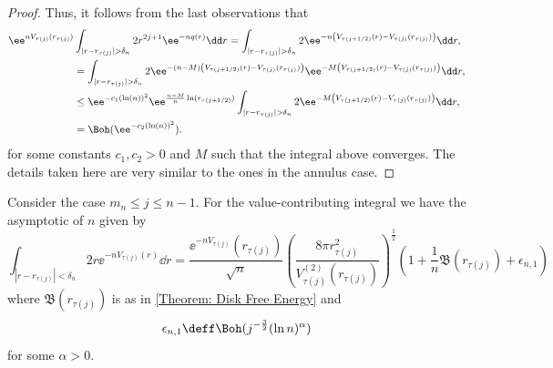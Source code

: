 \begin{proof}
Thus, it follows from the last observations that
\begin{align}
	\ee^{n V_{\tau(j)}(r_{\tau(j)})} & \int_{|r - r_{\tau(j)}| > \delta_n} 2 r^{2j + 1} \ee^{-n q(r)}  \dd r = \int_{|r - r_{\tau(j)}| > \delta_n} 2 \ee^{-n \left( V_{\tau(j + 1/2)}(r) - V_{\tau(j)}(r_{\tau(j)}) \right)} \dd r, \\	
	& = \int_{|r - r_{\tau(j)}| > \delta_n} 2 \ee^{-(n-M) \left( V_{\tau(j + 1/2)}(r) - V_{\tau(j)}(r_{\tau(j)}) \right)} \ee^{-M \left( V_{\tau(j + 1/2)}(r) - V_{\tau(j)}(r_{\tau(j)}) \right)} \dd r, \\	
	& \leq \ee^{-c_1 (\ln(n))^2} \ee^{\frac{n - M}{n} \ln(r_{\tau(j+1/2)})}  \int_{|r - r_{\tau(j)}| > \delta_n} 2 \ee^{-M \left( V_{\tau(j + 1/2)}(r) - V_{\tau(j)}(r_{\tau(j)}) \right)} \dd r, \\
	& = \Boh(\ee^{-c_2 (\ln(n))^2}).
\end{align}
for some constants $c_1, c_2 > 0$ and $M$ such that the integral above converges. The details taken here are very similar to the ones in the annulus case.
\end{proof}


\begin{lema} \label{Lemma: mn - N value contributing}
	Consider the case $m_n \leq j \leq n-1$. For the value-contributing integral we have the asymptotic of $n$ given by
	\begin{equation}
		\int_{|r - r_{\tau(j)}| < \delta_n} 2 r \ee^{-n V_{\tau(j)}(r)} \dd r= \frac{\ee^{-n V_{\tau(j)}}(r_{\tau(j)})}{\sqrt{n}} \left( \frac{8\pi r^2_{\tau(j)}}{V^{(2)}_{\tau(j)}(r_{\tau(j)})} \right)^{\frac{1}{2}} \left( 1 + \frac{1}{n} \mathfrak{B}(r_{\tau(j)}) + \epsilon_{n, 1} \right)
	\end{equation}
	where $\mathfrak{B}(r_{\tau(j)})$ is as in \autoref{Theorem: Disk Free Energy}	and
	\begin{equation}
		\epsilon_{n,1} \deff \Boh(j^{-\frac{3}{2}} (\ln n)^\alpha)
	\end{equation}
	for some $\alpha > 0$.
\end{lema}

